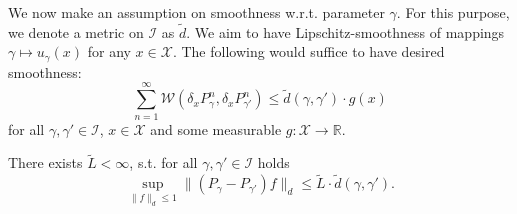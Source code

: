 We now make an assumption on smoothness w.r.t. parameter $\gamma$. For this purpose, we denote a metric on $\mathcal{I}$ as $\tilde{d}$.
We aim to have Lipschitz-smoothness of mappings $\gamma \mapsto u_{\gamma}(x)$ for any $x \in \mathcal{X}$. The following would suffice to have desired smoothness:
    \[
        \sum_{n=1}^{\infty} \mathcal{W}(\delta_xP_{\gamma}^n, \delta_xP_{\gamma'}^n) \leq \tilde{d}(\gamma, \gamma') \cdot g(x)
    \]
    for all $\gamma, \gamma' \in \mathcal{I}$, $x \in \mathcal{X}$ and some measurable $g \colon \mathcal{X} \to \mathbb{R}$. 
\begin{assumption}
\label{a:gamma-lipshitz}
    There exists $\tilde{L} < \infty$, s.t. for all  $\gamma, \gamma' \in \mathcal{I}$ holds
    \[
    \sup_{\| f \|_d \leq 1} \| (P_{\gamma}-P_{\gamma'})f \|_d \leq \tilde{L} \cdot \tilde{d}(\gamma, \gamma').
    \]
\end{assumption}


